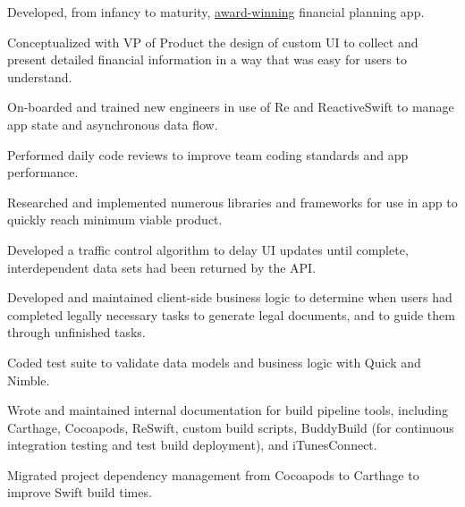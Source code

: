 \documentclass[]{jhearn-resume}
\begin{document}
\begin{minipage}[t]{0.64\textwidth}
\begin{tightemize}
\item Developed, from infancy to maturity, \href{https://tomorrow.me/trust-worthy/tomorrow-news/tomorrow-wins-at-plug-and-play-winter-summit/}{award-winning} financial planning app.
\item Conceptualized with VP of Product the design of custom UI to collect and present detailed financial information in a way that was easy for users to understand. 
\item On-boarded and trained new engineers in use of Re     and ReactiveSwift to manage app state and asynchronous data flow.
\item Performed daily code reviews to improve team coding standards and app performance.
\item Researched and implemented numerous libraries and frameworks for use in app to quickly reach minimum viable product.
\item Developed a traffic control algorithm to delay UI updates until complete, interdependent data sets had been returned by the API.
\item Developed and maintained client-side business logic to determine when users had completed legally necessary tasks to generate legal documents, and to guide them through unfinished tasks.
\item Coded test suite to validate data models and business logic with Quick and Nimble.
\item Wrote and maintained internal documentation for build pipeline tools, including Carthage, Cocoapods, ReSwift, custom build scripts, BuddyBuild (for continuous integration testing and test build deployment), and iTunesConnect.
\item Migrated project dependency management from Cocoapods to Carthage to improve Swift build times.

\end{tightemize}
\sectionsep


\end{minipage}
\end{document}
